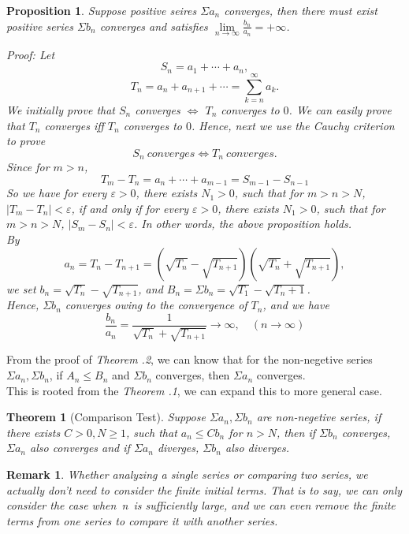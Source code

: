\documentclass[12pt]{article}
\theoremstyle{oneline}
\newtheorem{theorem}{Theorem}[subsection]
\newtheorem{remark}{Remark}[subsection]
\newtheorem{proposition}{Proposition}[subsection]
\theoremstyle{twoline}
\begin{document}
\begin{proposition}
  Suppose positive seires $\Sigma a_n$ converges, then there must exist positive series $\Sigma b_n$ converges and satisfies $\lim\limits_{n\to\infty}\frac{b_n}{a_n}=+\infty$.

\textit{Proof:} Let 
\[S_n=a_1+\cdots+a_n,\]
\[T_n=a_n+a_{n+1}+\cdots=\sum\limits_{k=n}^\infty a_k.\]
We initially prove that $S_n$ converges $\iff$ $T_n$ converges to $0$. We can easily prove that $T_n$ converges iff $T_n$ converges to $0$. Hence, next we use the Cauchy criterion to prove
\[S_n ~converges \iff T_n~ converges.\]
Since for $m>n$,
\[T_m-T_n=a_n+\cdots+a_{m-1}=S_{m-1}-S_{n-1}\]
So we have for every $\varepsilon>0$, there exists $N_1>0$, such that for $m>n>N$, $|T_m-T_n|<\varepsilon$, if and only if for every $\varepsilon>0$, there exists $N_1>0$, such that for $m>n>N$, $|S_m-S_n|<\varepsilon$.
In other words, the above proposition holds.\\
By
\[a_n=T_n-T_{n+1}=(\sqrt{T_n}-\sqrt{T_{n+1}})(\sqrt{T_n}+\sqrt{T_{n+1}}),\]
we set $b_n=\sqrt{T_n}-\sqrt{T_{n+1}}$, and $B_n=\Sigma b_n=\sqrt{T_1}-\sqrt{T_n+1}$.\\
Hence, $\Sigma b_n$ converges owing to the convergence of $T_n$, and we have 
\[\frac{b_n}{a_n}=\frac1{\sqrt{T_n}+\sqrt{T_{n+1}}}\to \infty,\quad (n\to \infty)\]
\end{proposition}

\introduction
\hspace*{2em}
From the proof of \textit{Theorem \thesubsection.2}, we can know that for the non-negetive series $\Sigma a_n, \Sigma b_n$, if $A_n\leq B_n$ and $\Sigma b_n$ converges, then $\Sigma a_n$ converges.\\
\hspace*{2em}
This is rooted from the \textit{Theorem \thesubsection.1}, we can expand this to more general case.

\begin{theorem}[Comparison Test]
  Suppose $\Sigma a_n, \Sigma b_n$ are non-negetive series, if there exists $C>0, N\geq1$, such that $a_n\leq Cb_n$ for $n>N$, then if $\Sigma b_n$ converges, $\Sigma a_n$ also converges and if $\Sigma a_n$ diverges, $\Sigma b_n$ also diverges.
\end{theorem}

\begin{remark}
  Whether analyzing a single series or comparing two series, we actually don't need to consider the finite initial terms. That is to say, we can only consider the case when n is sufficiently large, and we can even remove the finite terms from one series to compare it with another series.
\end{remark}
\end{document}
